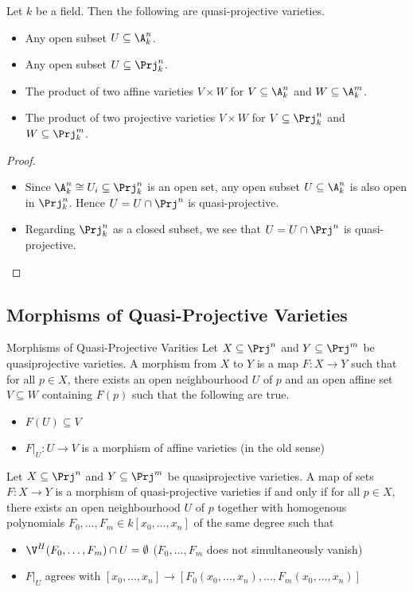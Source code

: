 \documentclass[a4paper]{article}
\begin{document}
\begin{prp}{}{} Let $k$ be a field. Then the following are quasi-projective varieties. 
\begin{itemize}
\item Any open subset $U\subseteq\A_k^n$. 
\item Any open subset $U\subseteq\Prj_k^n$. 
\item The product of two affine varieties $V\times W$ for $V\subseteq\A_k^n$ and $W\subseteq\A_k^m$. 
\item The product of two projective varieties $V\times W$ for $V\subseteq\Prj_k^n$ and $W\subseteq\Prj_k^m$. 
\end{itemize} 
\begin{proof}~\\
\begin{itemize}
\item Since $\A_k^n\cong U_i\subseteq\Prj_k^n$ is an open set, any open subset $U\subseteq\A_k^n$ is also open in $\Prj_k^n$. Hence $U=U\cap\Prj^n$ is quasi-projective. 
\item Regarding $\Prj_k^n$ as a closed subset, we see that $U=U\cap\Prj^n$ is quasi-projective. 
\end{itemize}
\end{proof}
\end{prp}

\subsection{Morphisms of Quasi-Projective Varieties}
\begin{defn}{Morphisms of Quasi-Projective Varities}{} Let $X\subseteq\Prj^n$ and $Y\subseteq\Prj^m$ be quasiprojective varieties. A morphism from $X$ to $Y$ is a map $F:X\to Y$ such that for all $p\in X$, there exists an open neighbourhood $U$ of $p$ and an open affine set $V\subseteq W$ containing $F(p)$ such that the following are true. 
\begin{itemize}
\item $F(U)\subseteq V$
\item $F|_U:U\to V$ is a morphism of affine varieties (in the old sense)
\end{itemize}
\end{defn}

\begin{prp}{}{} Let $X\subseteq\Prj^n$ and $Y\subseteq\Prj^m$ be quasiprojective varieties. A map of sets $F:X\to Y$ is a morphism of quasi-projective varieties if and only if for all $p\in X$, there exists an open neighbourhood $U$ of $p$ together with homogenous polynomials $F_0,\dots,F_m\in k[x_0,\dots,x_n]$ of the same degree such that 
\begin{itemize}
\item $\V^H(F_0,\dots,F_m)\cap U=\emptyset$ ($F_0,\dots,F_m$ does not simultaneously vanish)
\item $F|_U$ agrees with $[x_0,\dots,x_n]\to[F_0(x_0,\dots,x_n),\dots,F_m(x_0,\dots,x_n)]$
\end{itemize}
\end{prp}
\end{document}
